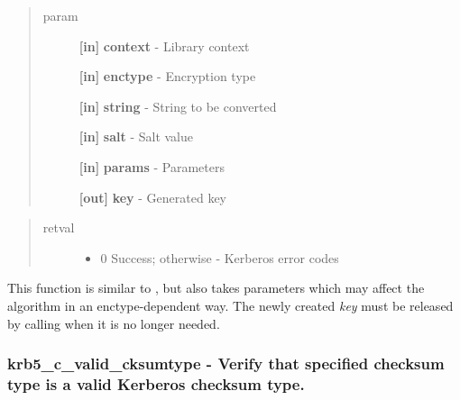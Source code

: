 \documentclass[letterpaper,10pt,english]{sphinxmanual}
\begin{document}
\begin{quote}\begin{description}
\item[{param}] \leavevmode
\textbf{{[}in{]}} \textbf{context} - Library context

\textbf{{[}in{]}} \textbf{enctype} - Encryption type

\textbf{{[}in{]}} \textbf{string} - String to be converted

\textbf{{[}in{]}} \textbf{salt} - Salt value

\textbf{{[}in{]}} \textbf{params} - Parameters

\textbf{{[}out{]}} \textbf{key} - Generated key

\end{description}\end{quote}
\begin{quote}\begin{description}
\item[{retval}] \leavevmode\begin{itemize}
\item {} 
0   Success; otherwise - Kerberos error codes

\end{itemize}

\end{description}\end{quote}

This function is similar to {\hyperref[appdev/refs/api/krb5_c_string_to_key:c.krb5_c_string_to_key]{}} , but also takes parameters which may affect the algorithm in an enctype-dependent way. The newly created \emph{key} must be released by calling {\hyperref[appdev/refs/api/krb5_free_keyblock_contents:c.krb5_free_keyblock_contents]{}} when it is no longer needed.


\subsubsection{krb5\_c\_valid\_cksumtype -  Verify that specified checksum type is a valid Kerberos checksum type.}
\label{appdev/refs/api/krb5_c_valid_cksumtype:krb5-c-valid-cksumtype-verify-that-specified-checksum-type-is-a-valid-kerberos-checksum-type}\label{appdev/refs/api/krb5_c_valid_cksumtype::doc}

\begin{fulllineitems}
\label{appdev/refs/api/krb5_c_valid_cksumtype:c.krb5_c_valid_cksumtype}
\end{fulllineitems}
\end{document}
